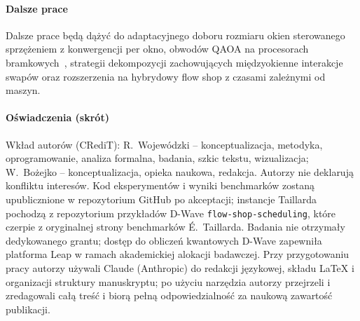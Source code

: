 \documentclass[11pt,a4paper]{article}
\begin{document}
\paragraph{Dalsze prace}
Dalsze prace będą dążyć do adaptacyjnego doboru rozmiaru okien
sterowanego sprzężeniem z konwergencji per okno, obwodów QAOA na
procesorach bramkowych~\citep{ref_willow}, strategii dekompozycji
zachowujących międzyokienne interakcje swapów oraz rozszerzenia na
hybrydowy flow shop z czasami zależnymi od maszyn.

\paragraph{Oświadczenia (skrót)}
Wkład autorów (CRediT): R.~Wojewódzki -- konceptualizacja,
metodyka, oprogramowanie, analiza formalna, badania, szkic tekstu,
wizualizacja; W.~Bożejko -- konceptualizacja, opieka naukowa,
redakcja. Autorzy nie deklarują konfliktu interesów. Kod
eksperymentów i wyniki benchmarków zostaną upublicznione w repozytorium
GitHub po akceptacji; instancje Taillarda pochodzą z repozytorium
przykładów D-Wave \texttt{flow-shop-scheduling}, które czerpie
z oryginalnej strony benchmarków É.~Taillarda. Badania nie otrzymały
dedykowanego grantu; dostęp do obliczeń kwantowych D-Wave zapewniła
platforma Leap w ramach akademickiej alokacji badawczej. Przy
przygotowaniu pracy autorzy używali Claude (Anthropic) do redakcji
językowej, składu LaTeX i organizacji struktury manuskryptu; po
użyciu narzędzia autorzy przejrzeli i zredagowali całą treść i biorą
pełną odpowiedzialność za naukową zawartość publikacji.
\end{document}
